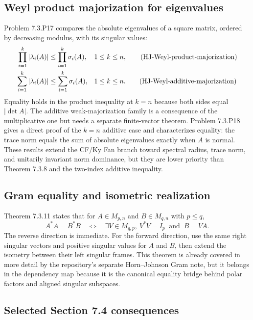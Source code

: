 \subsection{Weyl product majorization for eigenvalues}

Problem 7.3.P17 compares the absolute eigenvalues of a square matrix, ordered by decreasing modulus, with its singular values:
\begin{align}
  \prod_{i=1}^k|\lambda_i(A)|&\le\prod_{i=1}^k\sigma_i(A),
  &&1\le k\le n, \tag{HJ-Weyl-product-majorization}\\
  \sum_{i=1}^k|\lambda_i(A)|&\le\sum_{i=1}^k\sigma_i(A),
  &&1\le k\le n. \tag{HJ-Weyl-additive-majorization}
\end{align}
Equality holds in the product inequality at $k=n$ because both sides equal $|\det A|$. The additive weak-majorization family is a consequence of the multiplicative one but needs a separate finite-vector theorem. Problem 7.3.P18 gives a direct proof of the $k=n$ additive case and characterizes equality: the trace norm equals the sum of absolute eigenvalues exactly when $A$ is normal. These results extend the CF/Ky Fan branch toward spectral radius, trace norm, and unitarily invariant norm dominance, but they are lower priority than Theorem 7.3.8 and the two-index additive inequality.

\subsection{Gram equality and isometric realization}

Theorem 7.3.11 states that for $A\in M_{p,n}$ and $B\in M_{q,n}$ with $p\le q$,
\begin{equation}
  A^*A=B^*B
  \quad\Longleftrightarrow\quad
  \exists V\in M_{q,p},\ V^*V=I_p\ \text{ and }\ B=VA. \tag{HJ-Gram-isometry}
\end{equation}
The reverse direction is immediate. For the forward direction, use the same right singular vectors and positive singular values for $A$ and $B$, then extend the isometry between their left singular frames. This theorem is already covered in more detail by the repository's separate Horn--Johnson Gram note, but it belongs in the dependency map because it is the canonical equality bridge behind polar factors and aligned singular subspaces.

\subsection{Selected Section 7.4 consequences}

